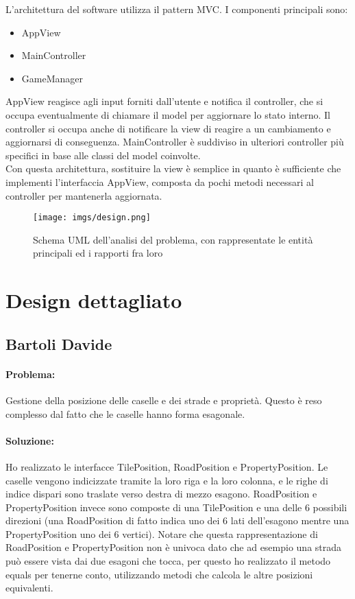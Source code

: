 \documentclass[a4paper,12pt]{report}
\begin{document}
L'architettura del software utilizza il pattern MVC. I componenti principali sono:
\begin{itemize}
    \item AppView
    \item MainController
    \item GameManager
\end{itemize}
AppView reagisce agli input forniti dall'utente e notifica il controller, che si occupa eventualmente di chiamare il model per aggiornare lo stato interno. Il controller si occupa anche di notificare la view di reagire a un cambiamento e aggiornarsi di conseguenza. MainController è suddiviso in ulteriori controller più specifici in base alle classi del model coinvolte.\\
Con questa architettura, sostituire la view è semplice in quanto è sufficiente che implementi l'interfaccia AppView, composta da pochi metodi necessari al controller per mantenerla aggiornata.

\begin{figure}[H]
\centering{}
\texttt{[image: imgs/design.png]}
\caption{Schema UML dell'analisi del problema, con rappresentate le entità principali ed i rapporti fra loro}
\label{img:analysis}
\end{figure}

\section{Design dettagliato}
\subsection{Bartoli Davide}
\paragraph{Problema:} Gestione della posizione delle caselle e dei strade e proprietà. Questo è reso complesso dal fatto che le caselle hanno forma esagonale.
\paragraph{Soluzione:} Ho realizzato le interfacce TilePosition, RoadPosition e PropertyPosition. Le caselle vengono indicizzate tramite la loro riga e la loro colonna, e le righe di indice dispari sono traslate verso destra di mezzo esagono. RoadPosition e PropertyPosition invece sono composte di una TilePosition e una delle 6 possibili direzioni (una RoadPosition di fatto indica uno dei 6 lati dell'esagono mentre una PropertyPosition uno dei 6 vertici). Notare che questa rappresentazione di RoadPosition e PropertyPosition non è univoca dato che ad esempio una strada può essere vista dai due esagoni che tocca, per questo ho realizzato il metodo equals per tenerne conto, utilizzando metodi che calcola le altre posizioni equivalenti. 
\end{document}
